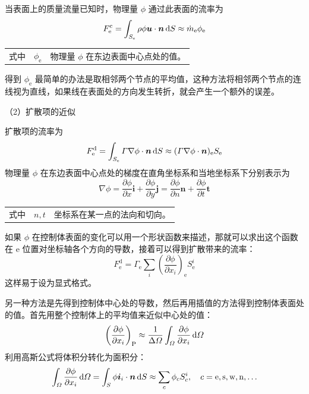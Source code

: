 当表面上的质量流量已知时，物理量 $\phi$ 通过此表面的流率为
\begin{equation}
	F_{\mathrm{e}}^{\mathrm{c}} = \int_{S_{\mathrm{e}}}\rho\phi\bm{u}\cdot\bm{n}\,\mathrm{d} S \approx \dot m_{\mathrm{e}} \phi_{\mathrm{e}}
\end{equation}
\begin{tabularx}{\textwidth}{@{}l@{\quad}r@{——}X@{}}
	式中 & $\phi_{\mathrm{e}}$ & 物理量 $\phi$ 在东边表面中心点处的值。
\end{tabularx}\vspace{3.15bp}
得到 $\phi_{\mathrm{e}}$ 最简单的办法是取相邻两个节点的平均值，这种方法将相邻两个节点的连线视为直线，如果线在表面处的方向发生转折，就会产生一个额外的误差。

（2）扩散项的近似

扩散项的流率为
\begin{equation}
	F_{\mathrm{e}}^{\mathrm{d}} = 
	\int_{S_{\mathrm{e}}}\varGamma\nabla\phi\cdot\bm{n}\,\mathrm{d} S \approx
	(\varGamma\nabla\phi\cdot\bm{n})_{\mathrm{e}} S_{\mathrm{e}}
\end{equation}
物理量 $\phi$ 在东边表面中心点处的梯度在直角坐标系和当地坐标系下分别表示为
\begin{equation}
	\nabla\phi = 
	\frac{\partial\phi}{\partial x}\bm{i} + \frac{\partial\phi}{\partial y}\bm{j} = 
	\frac{\partial\phi}{\partial n}\bm{n} + \frac{\partial\phi}{\partial t}\bm{t}
\end{equation}
\begin{tabularx}{\textwidth}{@{}l@{\quad}r@{——}X@{}}
	式中 & $n,t$ & 坐标系在某一点的法向和切向。
\end{tabularx}\vspace{3.15bp}

如果 $\phi$ 在控制体表面的变化可以用一个形状函数来描述，那就可以求出这个函数在 e 位置对坐标轴各个方向的导数，接着可以得到扩散带来的流率：
\begin{equation}\label{eq: diffusive flux}
	F_{\mathrm{e}}^{\mathrm{d}} = \varGamma_{\mathrm{e}} \sum_i \left(\frac{\partial\phi}{\partial x_i}\right)_{\mathrm{e}} S_{\mathrm{e}}^i
\end{equation}
这样易于设为显式格式。

另一种方法是先得到控制体中心处的导数，然后再用插值的方法得到控制体表面处的值。首先用整个控制体上的平均值来近似中心处的值：
\begin{equation}
	\left(\frac{\partial\phi}{\partial x_i}\right)_{\mathrm{P}} \approx
	\frac{1}{\Delta\varOmega}\int_{\varOmega}\frac{\partial\phi}{\partial x_i}\,\mathrm{d}\varOmega
\end{equation}
利用高斯公式将体积分转化为面积分：
\begin{equation}
	\int_{\varOmega}\frac{\partial\phi}{\partial x_i}\,\mathrm{d}\varOmega =
	\int_S \phi\bm{i}_i\cdot\bm{n}\,\mathrm{d} S \approx \sum_c\phi_c S_c^i,
	\quad c=\mathrm{e,s,w,n,\dots}
\end{equation}

